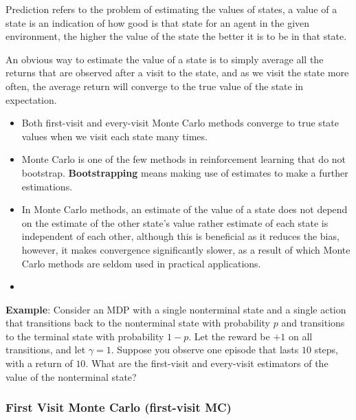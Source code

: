 Prediction refers to the problem of estimating the values of states, a value of a state is an indication of how good is that state for an agent in the given environment, the higher the value of the state the better it is to be in that state.

An obvious way to estimate the value of a state is to simply average all the returns that are observed after a visit to the state, and as we visit the state more often, the average return will converge to the true value of the state in expectation.

\begin{itemize}
    \item Both first-visit and every-visit Monte Carlo methods converge to true state values when we visit each state many times.

    \item Monte Carlo is one of the few methods in reinforcement learning that do not bootstrap. \textbf{Bootstrapping}\label{RL: Bootstrapping} means making use of estimates to make a further estimations.

    \item In Monte Carlo methods, an estimate of the value of a state does not depend on the estimate of the other state's value rather estimate of each state is independent of each other, although this is beneficial as it reduces the bias, however, it makes convergence significantly slower, as a result of which Monte Carlo methods are seldom used in practical applications.

    \item 

\end{itemize} 

\vspace{0.2cm}
\textbf{Example}: Consider an MDP with a single nonterminal state and a single action that transitions back to the nonterminal state with probability $p$ and transitions to the terminal state with probability $1-p$. Let the reward be $+1$ on all transitions, and let $\gamma=1$. Suppose you observe one episode that lasts $10$ steps, with a return of $10$. What are the first-visit and every-visit estimators of the value of the nonterminal state?

\subsubsection{First Visit Monte Carlo (first-visit MC) \cite{medium/nerd-for-tech/monte-carlo-methods-for-reinforcement-learning-d30d874dd817}}

